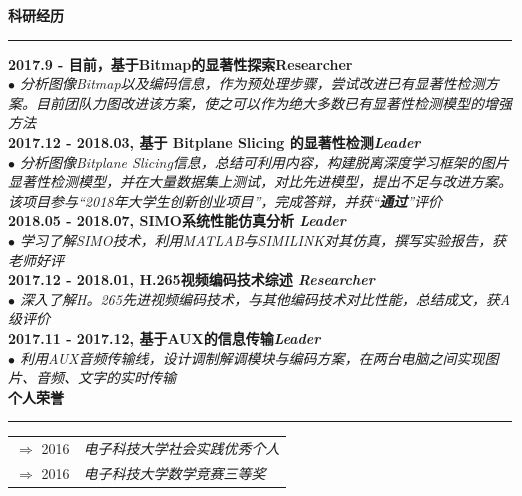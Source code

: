 \documentclass[a4paper,11pt,final]{memoir}
\newcommand{\myThemeColor}{RoyalBlue}
\newcommand{\SmallSep}{\vspace{0.9em}}
\newcommand{\CVSection}[1]
	{\Large\textbf{#1}\par
	\vspace{0.2cm}\normalsize\normalfont}
\newcommand{\CVItem}[1]
	{\textbf{\color{\myThemeColor} #1}}
\begin{document}
\begin{CJK*}{UTF8}{gbsn}
\CVSection{科研经历}
\hrule
\SmallSep
\CVItem{2017.9 - 目前，基于Bitmap的显著性探索\hfill\emph{}Researcher}\\
\textit{$\bullet$ 分析图像Bitmap以及编码信息，作为预处理步骤，尝试改进已有显著性检测方案。目前团队力图改进该方案，使之可以作为绝大多数已有显著性检测模型的增强方法} 
\\
\CVItem{2017.12 - 2018.03, 基于 Bitplane Slicing 的显著性检测\hfill\emph{Leader}}\\
\textit{$\bullet$ 分析图像Bitplane Slicing信息，总结可利用内容，构建脱离深度学习框架的图片显著性检测模型，并在大量数据集上测试，对比先进模型，提出不足与改进方案。该项目参与“2018年大学生创新创业项目”，完成答辩，并获“\textbf{通过}”评价} 
\\
\CVItem{2018.05 - 2018.07, SIMO系统性能仿真分析 \hfill\emph{Leader}}\\
\textit{$\bullet$ 学习了解SIMO技术，利用MATLAB与SIMILINK对其仿真，撰写实验报告，获老师好评} 
\\
\CVItem{2017.12 - 2018.01, H.265视频编码技术综述 \hfill\emph{Researcher}}\\
\textit{$\bullet$ 深入了解H。265先进视频编码技术，与其他编码技术对比性能，总结成文，获A级评价} 
\\
\CVItem{2017.11 - 2017.12, 基于AUX的信息传输\hfill\emph{Leader}}\\
\textit{$\bullet$ 利用AUX音频传输线，设计调制解调模块与编码方案，在两台电脑之间实现图片、音频、文字的实时传输}
\\

\CVSection{个人荣誉}
\hrule
\SmallSep
	\begin{tabular}{l|l}
		$\Rightarrow$ 2016&\textit{电子科技大学社会实践优秀个人}\footnotesize\\
		$\Rightarrow$ 2016&\textit{电子科技大学数学竞赛三等奖}\\
	\end{tabular}

\end{CJK*}
\end{document}
